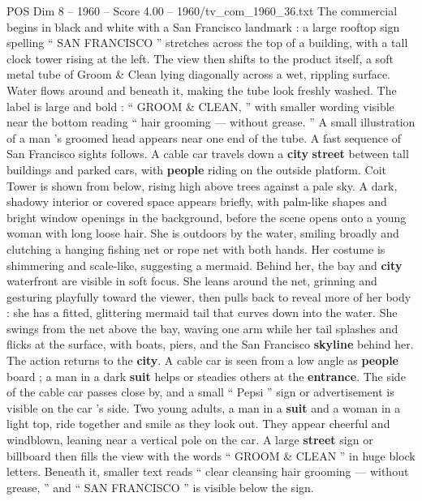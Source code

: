 \begin{textsample}{POS Dim 8 – 1960 – Score 4.00 – 1960/tv\_com\_1960\_36.txt}  \label{ex:f8_pos_088}
The commercial begins in black and white with a San Francisco landmark : a large rooftop sign spelling “ SAN FRANCISCO ” stretches across the top of a building, with a tall clock tower rising at the left.
The view then shifts to the product itself, a soft metal tube of Groom \& Clean lying diagonally across a wet, rippling surface.
Water flows around and beneath it, making the tube look freshly washed.
The label is large and bold : “ GROOM \& CLEAN, ” with smaller wording visible near the bottom reading “ hair grooming — without grease. ” A small illustration of a man ’s groomed head appears near one end of the tube.
A fast sequence of San Francisco sights follows.
A cable car travels down a \textbf{city} \textbf{street} between tall buildings and parked cars, with \textbf{people} riding on the outside platform.
Coit Tower is shown from below, rising high above trees against a pale sky.
A dark, shadowy interior or covered space appears briefly, with palm-like shapes and bright window openings in the background, before the scene opens onto a young woman with long loose hair.
She is outdoors by the water, smiling broadly and clutching a hanging fishing net or rope net with both hands.
Her costume is shimmering and scale-like, suggesting a mermaid.
Behind her, the bay and \textbf{city} waterfront are visible in soft focus.
She leans around the net, grinning and gesturing playfully toward the viewer, then pulls back to reveal more of her body : she has a fitted, glittering mermaid tail that curves down into the water.
She swings from the net above the bay, waving one arm while her tail splashes and flicks at the surface, with boats, piers, and the San Francisco \textbf{skyline} behind her.
The action returns to the \textbf{city}.
A cable car is seen from a low angle as \textbf{people} board ; a man in a dark \textbf{suit} helps or steadies others at the \textbf{entrance}.
The side of the cable car passes close by, and a small “ Pepsi ” sign or advertisement is visible on the car ’s side.
Two young adults, a man in a \textbf{suit} and a woman in a light top, ride together and smile as they look out.
They appear cheerful and windblown, leaning near a vertical pole on the car.
A large \textbf{street} sign or billboard then fills the view with the words “ GROOM \& CLEAN ” in huge block letters.
Beneath it, smaller text reads “ clear cleansing hair grooming — without grease, ” and “ SAN FRANCISCO ” is visible below the sign.

\end{textsample}
